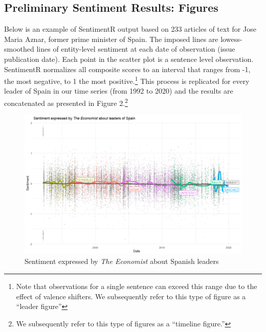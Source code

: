 \documentclass[11pt, letterpaper, twoside]{article}
\begin{document}
\subsection{Preliminary Sentiment Results: Figures}
Below is an example of SentimentR output based on 233 articles of text for Jose Maria Aznar, former prime minister of Spain. The imposed lines are lowess-smoothed lines of entity-level sentiment at each date of observation (issue publication date). Each point in the scatter plot is a sentence level observation. SentimentR normalizes all composite scores to an interval that ranges from -1, the most negative, to 1 the most positive.\footnote{Note that observations for a single sentence can exceed this range due to the effect of valence shifters. We subsequently refer to this type of figure as a ``leader figure''} This process is replicated for every leader of Spain in our time series (from 1992 to 2020) and the results are concatenated as presented in Figure 2.\footnote{We subsequently refer to this type of figures as a ``timeline figure.''}\\



\begin{figure} %
    \caption{Sentiment expressed by \textit{The Economist} about Spanish leaders}
    \centering
    \includegraphics[clip, width=\textwidth]{figures/230_timeline_fig.png}
\end{figure}
\end{document}
